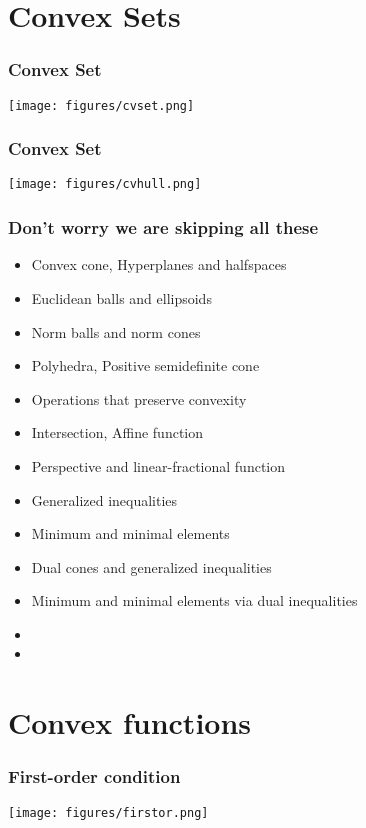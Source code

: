 \documentclass[10pt,mathserif]{beamer}
\begin{document}
\section{Convex Sets}
\begin{frame}\frametitle{Convex Set}
\begin{center}
\texttt{[image: figures/cvset.png]}
\end{center}
\end{frame}

\begin{frame}\frametitle{Convex Set}
\begin{center}
\texttt{[image: figures/cvhull.png]}
\end{center}
\end{frame}

\begin{frame}\frametitle{Don't worry we are skipping all these}

\begin{block}{}
\begin{itemize}
\item Convex cone,  Hyperplanes and halfspaces
\item Euclidean balls and ellipsoids
\item Norm balls and norm cones
\item Polyhedra, Positive semidefinite cone
\item Operations that preserve convexity
\item Intersection,  Affine function
\item Perspective and linear-fractional function
\item Generalized inequalities
\item Minimum and minimal elements
\item Dual cones and generalized inequalities
\item Minimum and minimal elements via dual inequalities
\item {}
\item {}
\end{itemize}
\end{block}
\end{frame}

\section{Convex functions}
\begin{frame}\frametitle{First-order condition}
\begin{center}
\texttt{[image: figures/firstor.png]}
\end{center}
\end{frame}
\end{document}
